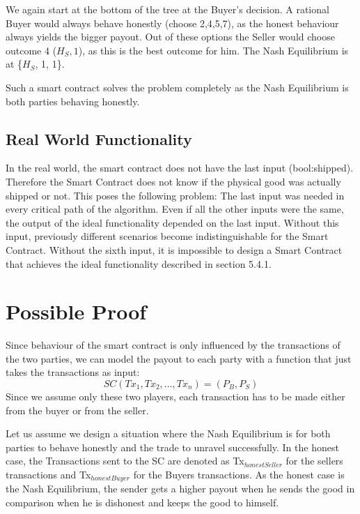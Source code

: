 \documentclass{cacthesis}
\begin{document}
We again start at the bottom of the tree at the Buyer's decision. A rational Buyer would always behave honestly (choose 2,4,5,7), as the honest behaviour always yields the bigger payout. Out of these options the Seller would choose outcome 4 ($H_S,1$), as this is the best outcome for him.\newline
The Nash Equilibrium is at \{$H_S$, 1, 1\}.\newline

Such a smart contract solves the problem completely as the Nash Equilibrium is both parties behaving honestly.
\subsection{Real World Functionality}
In the real world, the smart contract does not have the last input (bool:shipped). Therefore the Smart Contract does not know if the physical good was actually shipped or not. \newline
This poses the following problem: The last input was needed in every critical path of the algorithm. Even if all the other inputs were the same, the output of the ideal functionality depended on the last input. Without this input, previously different scenarios become indistinguishable for the Smart Contract. Without the sixth input, it is impossible to design a Smart Contract that achieves the ideal functionality described in section 5.4.1.


\section{Possible Proof}
Since behaviour of the smart contract is only influenced by the transactions of the two parties, we can model the payout to each party with a function that just takes the transactions as input:
\begin{equation}
    SC(Tx_1, Tx_2,...,Tx_n) = (P_B, P_S)
\end{equation}
Since we assume only these two players, each transaction has to be made either from the buyer or from the seller.\newline



Let us assume we design a situation where the Nash Equilibrium is for both parties to behave honestly and the trade to unravel successfully. In the honest case, the Transactions sent to the SC are denoted as Tx$_{honestSeller}$ for the sellers transactions and Tx$_{honestBuyer}$ for the Buyers transactions. \newline
As the honest case is the Nash Equilibrium, the sender gets a higher payout when he sends the good in comparison when he is dishonest and keeps the good to himself.
\end{document}
